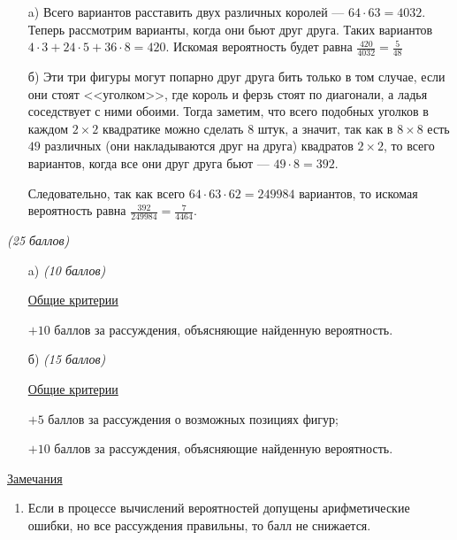 \solutionSection
\begin{enumerate}

    \item[a)] Всего вариантов расставить двух различных королей ---
	$64 \cdot 63 = 4032$. Теперь рассмотрим варианты, когда они бьют друг друга.
	Таких вариантов $4 \cdot 3 + 24 \cdot 5 + 36 \cdot 8 = 420$.
	Искомая вероятность будет равна $\frac{420}{4032} = \frac{5}{48}$
	
	\item[б)] Эти три фигуры могут попарно друг друга бить только в том случае, 
	если они стоят <<уголком>>, где король и ферзь стоят по диагонали, а 
	ладья соседствует с ними обоими. Тогда заметим, что всего подобных уголков 
	в каждом $2 \times 2$ квадратике можно сделать $8$ штук, а значит, так как
	в $8 \times 8$ есть $49$ различных (они накладываются друг на друга) квадратов
	$2 \times 2$, то всего вариантов, когда все они друг друга бьют --- $49 \cdot 8 = 392$.
	
	Следовательно, так как всего $64 \cdot 63 \cdot 62 = 249984$ вариантов, то
    искомая вероятность равна $\frac{392}{249984} = \frac{7}{4464}$.
    
\end{enumerate}


\additionalCriteria

\textit{(25 баллов)}

\begin{enumerate}
		
	\item[a)] \textit{(10 баллов)}

	\underline{Общие критерии}
	
	$+10$ баллов за рассуждения, объясняющие найденную вероятность.
	
	
	\item[б)] \textit{(15 баллов)}
	
	\underline{Общие критерии}
	
	$+5$ баллов за рассуждения о возможных позициях фигур;
	
	$+10$ баллов за рассуждения, объясняющие найденную вероятность.

\end{enumerate}

	\underline{Замечания} 
\begin{enumerate}
	\item Если в процессе вычислений вероятностей допущены арифметические ошибки,
	но все рассуждения правильны, то балл не снижается.
\end{enumerate}